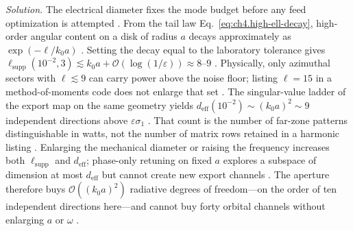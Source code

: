 \emph{Solution.} The electrical diameter fixes the mode budget before any feed optimization is attempted . From the tail law Eq.~\eqref{eq:ch4.high-ell-decay}, high-order angular content on a disk of radius $a$ decays approximately as $\exp(-\ell/k_{0}a)$ . Setting the decay equal to the laboratory tolerance gives $\ell_{\mathrm{supp}}(10^{-2},3)\lesssim k_{0}a+\mathcal{O}(\log(1/\varepsilon))\approx 8$--$9$ . Physically, only azimuthal sectors with $\ell\lesssim 9$ can carry power above the noise floor; listing $\ell=15$ in a method-of-moments code does not enlarge that set .
The singular-value ladder of the export map on the same geometry yields $d_{\mathrm{eff}}(10^{-2})\sim (k_{0}a)^{2}\sim 9$ independent directions above $\varepsilon\sigma_{1}$ . That count is the number of far-zone patterns distinguishable in watts, not the number of matrix rows retained in a harmonic listing . Enlarging the mechanical diameter or raising the frequency increases both $\ell_{\mathrm{supp}}$ and $d_{\mathrm{eff}}$; phase-only retuning on fixed $a$ explores a subspace of dimension at most $d_{\mathrm{eff}}$ but cannot create new export channels . The aperture therefore buys $\mathcal{O}((k_{0}a)^{2})$ radiative degrees of freedom---on the order of ten independent directions here---and cannot buy forty orbital channels without enlarging $a$ or $\omega$ .
